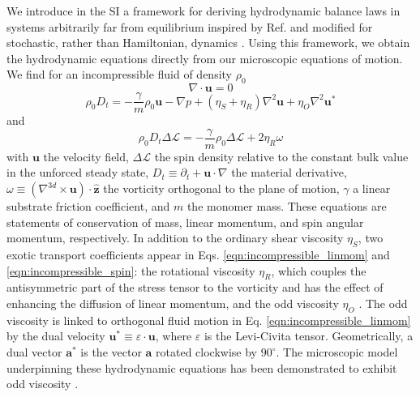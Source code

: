 \documentclass[%
 reprint,
superscriptaddress,
longbibliography,
 amsmath,amssymb,
 prl,
 citeautoscript,
]{revtex4-1}
\begin{document}
We introduce in the SI a framework for deriving hydrodynamic balance laws in systems arbitrarily far from equilibrium inspired by Ref. \cite{Irving+Kirkwood} and modified for stochastic, rather than Hamiltonian, dynamics \cite{dean, underdamped_dean}. Using this framework, we obtain the hydrodynamic equations directly from our microscopic equations of motion. We find for an incompressible fluid of density $\rho_0$
\begin{equation}
\nabla \cdot {\boldsymbol u} = 0
\label{eqn:incompressible_continuity}
\end{equation}
\begin{equation}
\rho_0 D_t = - \frac{\gamma}{m} \rho_0 {\boldsymbol u} - \nabla p + \left( \eta_S + \eta_R \right) \nabla^2 {\boldsymbol u} + \eta_O \nabla^2 {\boldsymbol u}^*
\label{eqn:incompressible_linmom}
\end{equation}
and
\begin{equation}
\rho_0 D_t \Delta \mathcal{L} = - \frac{\gamma}{m} \rho_0 \Delta \mathcal{L} + 2 \eta_R \omega
\label{eqn:incompressible_spin}
\end{equation}
with ${\boldsymbol u}$ the velocity field, $\Delta \mathcal{L}$ the spin density relative to the constant bulk value in the unforced steady state, $D_t \equiv \partial_t + {\boldsymbol u} \cdot \nabla$ the material derivative, $\omega \equiv \left( \nabla^{3d} \times {\boldsymbol u}  \right) \cdot \hat{\boldsymbol z}$ the vorticity orthogonal to the plane of motion, $\gamma$ a linear substrate friction coefficient, and $m$ the monomer mass. These equations are statements of conservation of mass, linear momentum, and spin angular momentum, respectively. In addition to the ordinary shear viscosity $\eta_S$, two exotic transport coefficients appear in Eqs. \ref{eqn:incompressible_linmom} and \ref{eqn:incompressible_spin}: the rotational viscosity $\eta_R$, which couples the antisymmetric part of the stress tensor to the vorticity and has the effect of enhancing the diffusion of linear momentum, and the odd viscosity $\eta_O$ \cite{Avron, Kranthi_hydro_eqns, Banerjee, Kranthi1, bubble_dynamics_odd_viscosity, Vitellis_pretty_pictures, Liao_PDFmechanics, 3d_odd_viscosity}. The odd viscosity is linked to orthogonal fluid motion in Eq. \ref{eqn:incompressible_linmom} by the dual velocity ${\boldsymbol u}^* \equiv \varepsilon \cdot {\boldsymbol u}$, where $\varepsilon$ is the Levi-Civita tensor. Geometrically, a dual vector ${\boldsymbol a}^*$ is the vector ${\boldsymbol a}$ rotated clockwise by $90^\circ$. The microscopic model underpinning these hydrodynamic equations has been demonstrated to exhibit odd viscosity \cite{Cory_MD, my_PRL}. 
\end{document}
